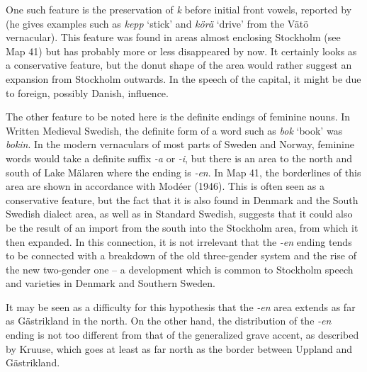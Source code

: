 \begin{styleBodytextC}
One such feature is the preservation of \textit{k} before initial front vowels, reported by \citet{Kruuse1908} (he gives examples such as \textit{kepp} ‘stick’ and \textit{körä} ‘drive’ from the Vätö vernacular). This feature was found in areas almost enclosing Stockholm (see Map 41) but has probably more or less disappeared by now. It certainly looks as a conservative feature, but the donut shape of the area would rather suggest an expansion from Stockholm outwards. In the speech of the capital, it might be due to foreign, possibly Danish, influence.

\end{styleBodytextC}

\begin{styleBodytextC}
The other feature to be noted here is the definite endings of feminine nouns. In Written Medieval Swedish, the definite form of a word such as \textit{bok} ‘book’ was \textit{bokin}. In the modern vernaculars of most parts of Sweden and Norway, feminine words would take a definite suffix\textit{ -a} or\textit{ -}\textit{i}, but there is an area to the north and south of Lake Mälaren where the ending is\textit{ -}\textit{en}. In Map 41, the borderlines of this area are shown in accordance with Modéer (1946). This is often seen as a conservative feature, but the fact that it is also found in Denmark and the South Swedish dialect area, as well as in Standard Swedish, suggests that it could also be the result of an import from the south into the Stockholm area, from which it then expanded. In this connection, it is not irrelevant that the \textit{{}-en} ending tends to be connected with a breakdown of the old three-gender system and the rise of the new two-gender one – a development which is common to Stockholm speech and varieties in Denmark and Southern Sweden.

\end{styleBodytextC}

\begin{styleBodytextC}
It may be seen as a difficulty for this hypothesis that the \textit{{}-en} area extends as far as Gästrikland in the north. On the other hand, the distribution of the \textit{{}-en} ending is not too different from that of the generalized grave accent, as described by Kruuse, which goes at least as far north as the border between Uppland and Gästrikland.

\end{styleBodytextC}

